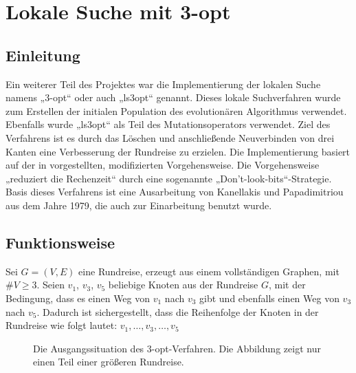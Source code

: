 \chapter{Lokale Suche mit 3-opt}
\section{Einleitung}
Ein weiterer Teil des Projektes war die Implementierung der lokalen
Suche namens „3-opt“ oder auch „ls3opt“ genannt. Dieses lokale 
Suchverfahren wurde zum Erstellen der initialen Population des 
evolutionären Algorithmus verwendet. Ebenfalls wurde „ls3opt“ als Teil
des Mutationsoperators verwendet. Ziel des Verfahrens ist es durch das 
Löschen und anschließende Neuverbinden von drei Kanten eine Verbesserung der Rundreise zu erzielen. Die Implementierung basiert auf der in
\cite{nagata} vorgestellten, modifizierten Vorgehensweise. Die Vorgehensweise „reduziert die Rechenzeit“\cite{gapx} durch
eine sogenannte „Don't-look-bits“-Strategie. Basis dieses Verfahrens ist
eine Ausarbeitung von Kanellakis und Papadimitriou\cite{ls3opt_atsp} aus dem Jahre 1979,
die auch zur Einarbeitung benutzt wurde. 

\section{Funktionsweise}
Sei $G = (V,E)$ eine Rundreise, erzeugt aus einem vollständigen Graphen,
mit $\#V \geq 3$.
Seien $v_1$, $v_3$, $v_5$ beliebige Knoten aus der Rundreise $G$, mit
der Bedingung, dass es einen Weg von $v_1$ nach $v_3$ gibt und ebenfalls
einen Weg von $v_3$ nach $v_5$. Dadurch ist sichergestellt, dass die
Reihenfolge der Knoten in der Rundreise wie folgt lautet: $v_1, \dotsc, v_3, \dotsc, v_5$
\begin{figure}[bh]
\centering
{}
\caption[Ausgangssituation 3-opt]{Die Ausgangssituation des
3-opt-Verfahren. Die Abbildung zeigt nur einen Teil einer größeren
Rundreise.}
\end {figure}

